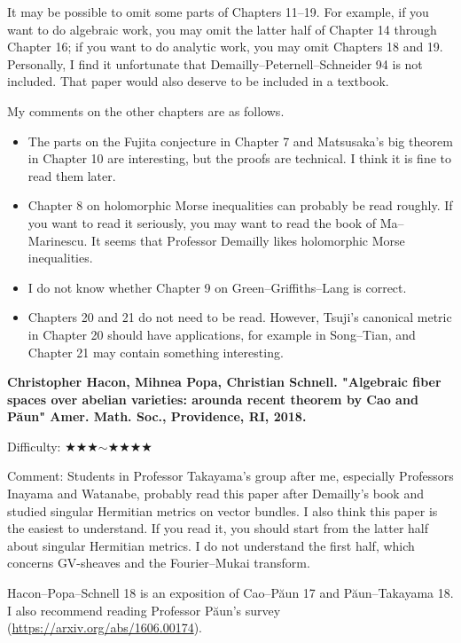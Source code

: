 It may be possible to omit some parts of Chapters 11--19. For example, if you want to do algebraic work, you may omit the latter half of Chapter 14 through Chapter 16; if you want to do analytic work, you may omit Chapters 18 and 19. Personally, I find it unfortunate that Demailly--Peternell--Schneider 94 is not included. That paper would also deserve to be included in a textbook.

My comments on the other chapters are as follows.
\vspace{-8pt}
\begin{itemize}[left=0pt]
  \setlength{\parskip}{0cm} %
  \setlength{\itemsep}{0cm} %
\item The parts on the Fujita conjecture in Chapter 7 and Matsusaka's big theorem in Chapter 10 are interesting, but the proofs are technical.  I think it is fine to read them later.
\item Chapter 8 on holomorphic Morse inequalities can probably be read roughly. If you want to read it seriously, you may want to read the book of Ma--Marinescu. It seems that Professor Demailly likes holomorphic Morse inequalities.
\item I do not know whether Chapter 9 on Green--Griffiths--Lang is correct.
\item Chapters 20 and 21 do not need to be read. However, Tsuji's canonical metric in Chapter 20 should have applications, for example in Song--Tian, and Chapter 21 may contain something interesting.
\end{itemize}
\vspace{8pt}

\textbf{Christopher Hacon, Mihnea Popa, Christian Schnell. "Algebraic fiber spaces over abelian varieties: arounda recent theorem by Cao and P\u{a}un"  Amer. Math. Soc., Providence, RI, 2018.}  \vspace{-6pt} 

Difficulty: ★★★$\sim$★★★★ \vspace{-6pt} 

Comment: Students in Professor Takayama's group after me, especially Professors Inayama and Watanabe, probably read this paper after Demailly's book and studied singular Hermitian metrics on vector bundles. I also think this paper is the easiest to understand. If you read it, you should start from the latter half about singular Hermitian metrics. I do not understand the first half, which concerns GV-sheaves and the Fourier--Mukai transform.

Hacon--Popa--Schnell 18 is an exposition of Cao--P\u{a}un 17 and P\u{a}un--Takayama 18. I also recommend reading Professor P\u{a}un's survey (\url{https://arxiv.org/abs/1606.00174}).
\vspace{8pt}

